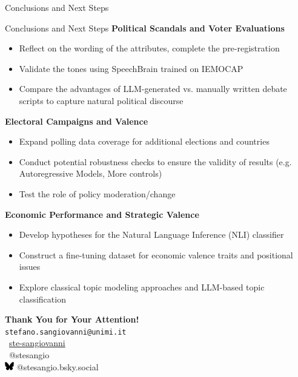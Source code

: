 \documentclass[9pt, aspectratio=169]{beamer}
\newcommand{\customcite}[1]{\textcolor{blue}{\footnotesize\parencite{#1}}}
\begin{document}
\begin{section}{Conclusions and Next Steps}
\begin{frame}{Conclusions and Next Steps}
    \textbf{Political Scandals and Voter Evaluations}
    \begin{itemize}
        \item Reflect on the wording of the attributes, complete the pre-registration
        \item Validate the tones using SpeechBrain \customcite{speechbrain} trained on IEMOCAP
        \item Compare the advantages of LLM-generated vs. manually written debate scripts to capture natural political discourse
    \end{itemize}
    \vspace{0.2cm}
    \textbf{Electoral Campaigns and Valence}
    \begin{itemize}
        \item Expand polling data coverage for additional elections and countries
        \item Conduct potential robustness checks to ensure the validity of results (e.g. Autoregressive Models, More controls)
        \item Test the role of policy moderation/change 
    \end{itemize}
    \vspace{0.2cm}
    \textbf{Economic Performance and Strategic Valence}
    \begin{itemize}
        \item Develop hypotheses for the Natural Language Inference (NLI) classifier
        \item Construct a fine-tuning dataset for economic valence traits and positional issues
        \item Explore classical topic modeling approaches and LLM-based topic classification
    \end{itemize}
    \end{frame}
\end{section}

\begin{frame}[plain]
\centering
\vspace{2cm}
\textbf{\large Thank You for Your Attention!} \\ [0.2cm] 
\texttt{stefano.sangiovanni@unimi.it} \\[3cm]

\faGithub\ \href{https://github.com/ste-sangiovanni}{ste-sangiovanni} \\[0.1cm]
\faTwitter\ @stesangio \\ 
\includegraphics[width=0.03\textwidth]{images/Bluesky_logo_(black).svg.png} @stesangio.bsky.social
\vspace{0.2cm}
\end{frame}
\end{document}
